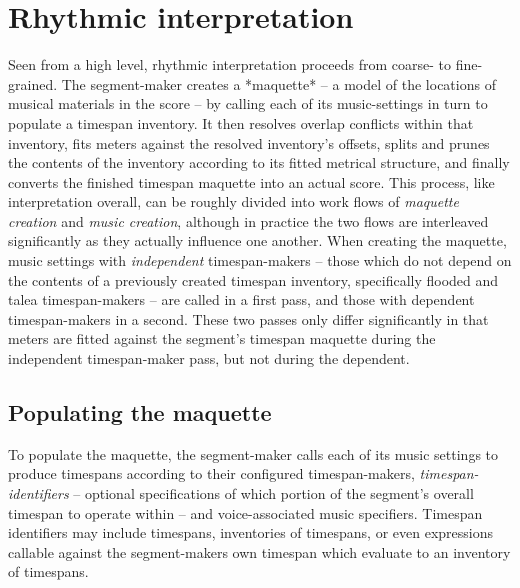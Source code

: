 \section{Rhythmic interpretation}
\label{sec:rhythmic-interpretation}

Seen from a high level, rhythmic interpretation proceeds from coarse- to
fine-grained. The segment-maker creates a *maquette* -- a model of the locations
of musical materials in the score -- by calling each of its
music-settings in turn to populate a timespan inventory. It then resolves
overlap conflicts within that inventory, fits meters against the resolved
inventory's offsets, splits and prunes the contents of the inventory according
to its fitted metrical structure, and finally converts the finished timespan
maquette into an actual score. This process, like interpretation overall, can
be roughly divided into work flows of \emph{maquette creation} and \emph{music
creation}, although in practice the two flows are interleaved significantly as
they actually influence one another. When creating the maquette, music settings
with \emph{independent} timespan-makers -- those which do not depend on the
contents of a previously created timespan inventory, specifically flooded and
talea timespan-makers -- are called in a first pass, and those with {dependent}
timespan-makers in a second. These two passes only differ significantly in that
meters are fitted against the segment's timespan maquette during the
independent timespan-maker pass, but not during the dependent.

\subsection{Populating the maquette}
\label{ssec:populating-the-maquette}

To populate the maquette, the segment-maker calls each of its music settings to
produce timespans according to their configured timespan-makers,
\emph{timespan-identifiers} -- optional specifications of which portion of the
segment's overall timespan to operate within -- and voice-associated music
specifiers. Timespan identifiers may include timespans, inventories of
timespans, or even expressions callable against the segment-makers own timespan
which evaluate to an inventory of timespans. 

